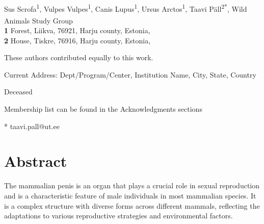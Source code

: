 \documentclass[
  10pt,
  letterpaper,
]{article}
\begin{document}
\vspace*{0.2in}

\begin{flushleft}
{\Large
\textbf{} %
}
\newline
\\
Sus Scrofa\textsuperscript{1\Yinyang}, Vulpes
Vulpes\textsuperscript{1\Yinyang}, Canis
Lupus\textsuperscript{1\dag}, Ursus Arctos\textsuperscript{1}, Taavi
Päll\textsuperscript{2*}, Wild Animals Study
Group\textsuperscript{\textpilcrow}
\\
\bigskip
\textbf{1} Forest, Liikva, 76921, Harju
county, Estonia, \\ \textbf{2} House, Tiskre, 76916, Harju
county, Estonia, 
\bigskip

% 
%
\Yinyang These authors contributed equally to this work.


\textcurrency Current Address: Dept/Program/Center, Institution Name, City, State, Country %

\dag Deceased

\textpilcrow Membership list can be found in the Acknowledgments
sections

* taavi.pall@ut.ee

\end{flushleft}

\section*{Abstract}
The mammalian penis is an organ that plays a crucial role in sexual
reproduction and is a characteristic feature of male individuals in most
mammalian species. It is a complex structure with diverse forms across
different mammals, reflecting the adaptations to various reproductive
strategies and environmental factors.
\end{document}
